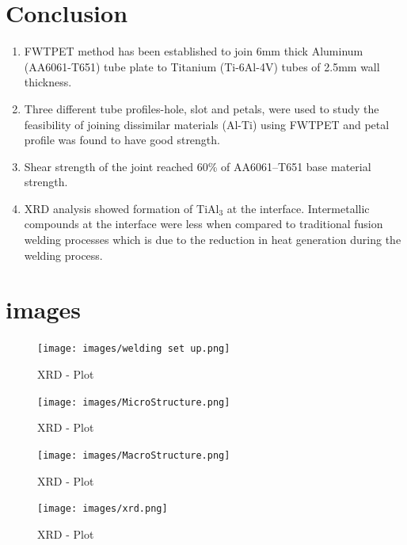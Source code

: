 \documentclass[3p]{elsarticle}
\begin{document}
\section{Conclusion}
\label{sec:Conclusion}
\begin{enumerate}[1.]
\item FWTPET method has been established to join 6mm thick Aluminum (AA6061-T651) tube plate to Titanium (Ti-6Al-4V) tubes of 2.5mm wall thickness.
\item Three different tube profiles-hole, slot and petals, were used to study the feasibility of joining dissimilar materials (Al-Ti) using FWTPET and petal profile was found to have good strength.
\item Shear strength of the joint reached 60\% of AA6061–T651 base material strength.
\item XRD analysis showed formation of TiAl$_{3}$ at the interface. Intermetallic compounds at the interface were less when compared to traditional fusion welding processes which is due to the reduction in heat generation during the welding process.
\end{enumerate}


\section{images}
\begin{figure}[!htbp]
\centering
\texttt{[image: images/welding set up.png]}
\caption{XRD - Plot}
\label{fig:xrd-plot}
\end{figure}

\begin{figure}[!htbp]
\centering
\texttt{[image: images/MicroStructure.png]}
\caption{XRD - Plot}
\label{fig:xrd-plot}
\end{figure}

\begin{figure}[!htbp]
\centering
\texttt{[image: images/MacroStructure.png]}
\caption{XRD - Plot}
\label{fig:xrd-plot}
\end{figure}

\begin{figure}[!htbp]
\centering
\texttt{[image: images/xrd.png]}
\caption{XRD - Plot}
\label{fig:xrd-plot}
\end{figure}


\end{document}
